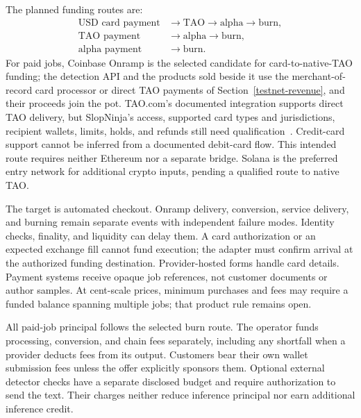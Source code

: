 The planned funding routes are:
\[
\begin{aligned}
\text{USD card payment} &\longrightarrow \text{TAO}
  \longrightarrow \text{alpha} \longrightarrow \text{burn},\\
\text{TAO payment} &\longrightarrow \text{alpha}
  \longrightarrow \text{burn},\\
\text{alpha payment} &\longrightarrow \text{burn}.
\end{aligned}
\]
For paid jobs, Coinbase Onramp is the selected candidate for card-to-native-TAO
funding; the detection API and the products sold beside it use the
merchant-of-record card processor or direct TAO payments of
Section~\ref{testnet-revenue}, and their proceeds join the pot. TAO.com's documented integration supports direct TAO
delivery, but
SlopNinja's access, supported card types and jurisdictions, recipient wallets,
limits, holds, and refunds still need qualification~\cite{coinbaseonramp}.
Credit-card support cannot be inferred from a documented debit-card flow.
This intended route requires neither Ethereum nor a separate bridge. Solana
is the preferred entry network for additional crypto inputs, pending a
qualified route to native TAO.

The target is automated checkout. Onramp delivery, conversion, service delivery,
and burning remain separate events with independent failure modes. Identity
checks, finality, and liquidity can delay them. A card authorization or an
expected exchange fill cannot fund execution; the adapter must confirm arrival
at the authorized funding destination. Provider-hosted forms handle card
details. Payment systems receive opaque job references, not customer documents
or author samples. At cent-scale prices, minimum purchases and fees may require
a funded balance spanning multiple jobs; that product rule remains open.

All paid-job principal follows the selected burn route. The operator funds
processing, conversion, and chain fees separately, including any shortfall
when a provider deducts fees from its output. Customers bear their own wallet
submission fees unless the offer explicitly sponsors them. Optional external
detector checks have a separate disclosed budget and require authorization to
send the text. Their charges neither reduce inference principal nor earn
additional inference credit.

